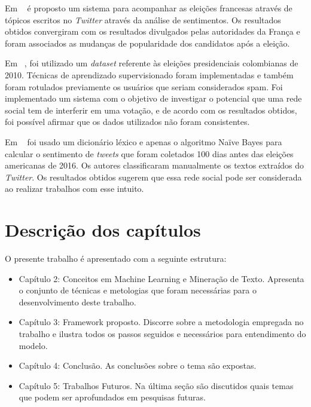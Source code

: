 Em  ~\cite{wegrzyn2012tweets} é proposto um sistema para acompanhar as eleições francesas através de tópicos escritos no \textit{Twitter} através da análise de sentimentos.
Os resultados obtidos convergiram com os resultados divulgados pelas autoridades da França e foram associados as mudanças de popularidade dos candidatos após a eleição.



Em ~\cite{guzman}, foi utilizado um \textit{dataset} referente às eleições presidenciais colombianas de 2010. Técnicas de aprendizado supervisionado foram implementadas e também foram 
rotulados previamente os usuários que seriam considerados spam. Foi implementado um sistema com o objetivo de investigar o potencial que uma rede social tem de interferir em 
uma votação, e de acordo com os resultados obtidos, foi possível afirmar que os dados utilizados não foram consistentes.



Em ~\cite{joyce} foi usado um dicionário léxico e apenas o algoritmo Naïve Bayes para calcular o sentimento de \textit{tweets} que foram coletados 100 dias antes das eleições americanas
de 2016. Os autores classificaram manualmente os textos extraídos do \textit{Twitter}. Os resultados obtidos sugerem que essa rede social pode ser considerada ao realizar 
trabalhos com esse intuito.

\section{Descrição dos capítulos}

O presente trabalho é apresentado com a seguinte estrutura:

\begin{itemize}
	\item Capítulo 2: Conceitos em Machine Learning e Mineração de Texto. Apresenta o conjunto de técnicas
	      e metologias que foram necessárias para o desenvolvimento deste trabalho.
	\item Capítulo 3: Framework proposto. Discorre sobre a metodologia empregada no trabalho e ilustra todos os passos
	      seguidos e necessários para entendimento do modelo.
	\item Capítulo 4: Conclusão. As conclusões sobre o tema são expostas.
	\item Capítulo 5: Trabalhos Futuros. Na última seção são discutidos quais temas que podem ser aprofundados em pesquisas futuras.
\end{itemize}